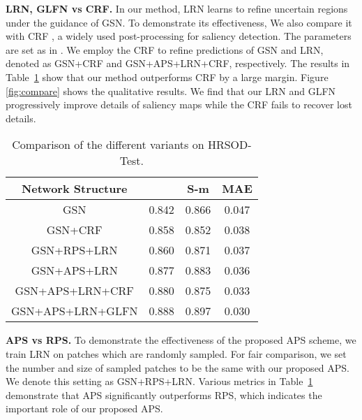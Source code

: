 \documentclass[10pt,twocolumn,letterpaper]{article}
\begin{document}
\textbf{LRN, GLFN vs CRF.} In our method, LRN learns to refine uncertain regions under the guidance of GSN. To demonstrate its effectiveness, We also compare it with CRF \cite{krahenbuhl2011efficient}, a widely used post-processing for saliency detection. The parameters are set as in \cite{hou2017deeply}. We employ the CRF to refine predictions of GSN and LRN, denoted as GSN+CRF and GSN+APS+LRN+CRF, respectively. The results in Table~\ref{tab:cmw_asm} show that our method outperforms CRF by a large margin.
Figure \ref{fig:compare} shows the qualitative results. We find that our LRN and GLFN progressively improve details
of saliency maps while the CRF fails to recover lost details.
\begin{table}[htp]
\setlength{\tabcolsep}{5pt}
\centering
\renewcommand{\arraystretch}{1}
\begin{tabular}{|c|c|c|c|}
\hline
Network Structure&&S-m& MAE\\
\hline
GSN&0.842&0.866&0.047\\
\hline
GSN+CRF&0.858&0.852&0.038\\
\hline
GSN+RPS+LRN&0.860&0.871&0.037\\
\hline
GSN+APS+LRN&0.877&0.883&0.036\\
\hline
GSN+APS+LRN+CRF&0.880&0.875&0.033\\
\hline
GSN+APS+LRN+GLFN&0.888&0.897&0.030\\
\hline
\end{tabular}
\vspace{0.5mm}
\caption{Comparison of the different variants on HRSOD-Test.}\label{tab:cmw_asm}
\vspace{-3mm}
\end{table}

\textbf{APS vs RPS.} To demonstrate the effectiveness of the proposed APS scheme, we train LRN on patches which are randomly sampled. For fair comparison, we set the number and size of sampled patches to be the same with our proposed APS.
We denote this setting as GSN+RPS+LRN. Various metrics in Table~\ref{tab:cmw_asm}  demonstrate that APS significantly outperforms RPS, which indicates the important role of our proposed APS.
\end{document}
